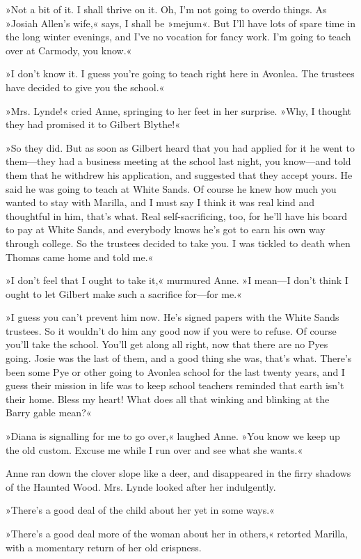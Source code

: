 »Not a bit of it. I shall thrive on it. Oh, I'm not going to overdo things. As »Josiah Allen's wife,« says, I shall be »mejum«. But I'll have lots of spare time in the long winter evenings, and I've no vocation for fancy work. I'm going to teach over at Carmody, you know.«

»I don't know it. I guess you're going to teach right here in Avonlea. The trustees have decided to give you the school.«

»Mrs. Lynde!« cried Anne, springing to her feet in her surprise. »Why, I thought they had promised it to Gilbert Blythe!«

»So they did. But as soon as Gilbert heard that you had applied for it he went to them—they had a business meeting at the school last night, you know—and told them that he withdrew his application, and suggested that they accept yours. He said he was going to teach at White Sands. Of course he knew how much you wanted to stay with Marilla, and I must say I think it was real kind and thoughtful in him, that's what. Real self-sacrificing, too, for he'll have his board to pay at White Sands, and everybody knows he's got to earn his own way through college. So the trustees decided to take you. I was tickled to death when Thomas came home and told me.«

»I don't feel that I ought to take it,« murmured Anne. »I mean—I don't think I ought to let Gilbert make such a sacrifice for—for me.«

»I guess you can't prevent him now. He's signed papers with the White Sands trustees. So it wouldn't do him any good now if you were to refuse. Of course you'll take the school. You'll get along all right, now that there are no Pyes going. Josie was the last of them, and a good thing she was, that's what. There's been some Pye or other going to Avonlea school for the last twenty years, and I guess their mission in life was to keep school teachers reminded that earth isn't their home. Bless my heart! What does all that winking and blinking at the Barry gable mean?«

»Diana is signalling for me to go over,« laughed Anne. »You know we keep up the old custom. Excuse me while I run over and see what she wants.«

Anne ran down the clover slope like a deer, and disappeared in the firry shadows of the Haunted Wood. Mrs. Lynde looked after her indulgently.

»There's a good deal of the child about her yet in some ways.«

»There's a good deal more of the woman about her in others,« retorted Marilla, with a momentary return of her old crispness.

